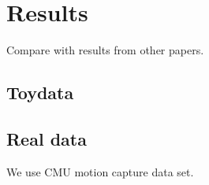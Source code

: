 \section{Results}
Compare with results from other papers. 

\subsection{Toydata}
\subsection{Real data}
We use CMU motion capture data set.